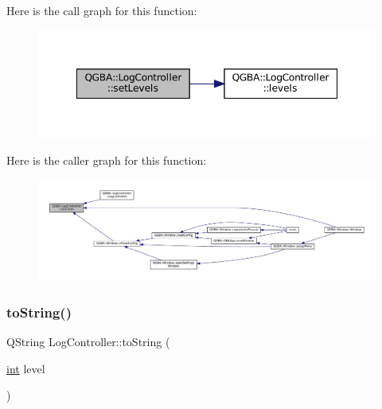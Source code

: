 Here is the call graph for this function\+:
\nopagebreak
\begin{figure}[H]
\begin{center}
\leavevmode
\includegraphics[width=348pt]{class_q_g_b_a_1_1_log_controller_a2aedba693013b937e0020396913db8fb_cgraph}
\end{center}
\end{figure}
Here is the caller graph for this function\+:
\nopagebreak
\begin{figure}[H]
\begin{center}
\leavevmode
\includegraphics[width=350pt]{class_q_g_b_a_1_1_log_controller_a2aedba693013b937e0020396913db8fb_icgraph}
\end{center}
\end{figure}
\mbox{\label{class_q_g_b_a_1_1_log_controller_af48bd4df0f5b8be07c701da6857e16c1}} 
\subsubsection{\texorpdfstring{to\+String()}{toString()}}
{\footnotesize\ttfamily Q\+String Log\+Controller\+::to\+String (\begin{DoxyParamCaption}\item[{\mbox{\hyperlink{ioapi_8h_a787fa3cf048117ba7123753c1e74fcd6}{int}}}]{level }\end{DoxyParamCaption})\hspace{0.3cm}{\ttfamily [static]}}

